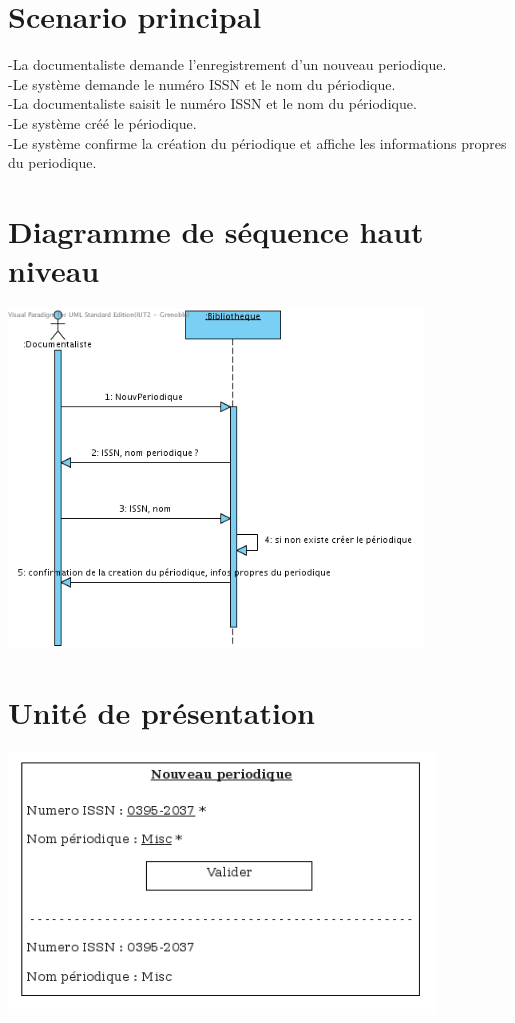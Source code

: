 \documentclass[a4paper,10pt]{report}
\begin{document}
\section*{Scenario principal}
\begin{flushleft}
-La documentaliste demande l'enregistrement d'un nouveau periodique.\\
-Le système demande le numéro ISSN et le nom du périodique.\\
-La documentaliste saisit le numéro ISSN et le nom du périodique.\\
-Le système créé le périodique.\\
-Le système confirme la création du périodique et affiche les informations propres du periodique.\\
\end{flushleft}

\bigskip

\section*{Diagramme de séquence haut niveau}
\includegraphics[height=90mm]{NouvPerHautNiveau.png}

\newpage

\section*{Unité de présentation}
\includegraphics[height=70mm]{UpNouvPer.png}
\end{document}
